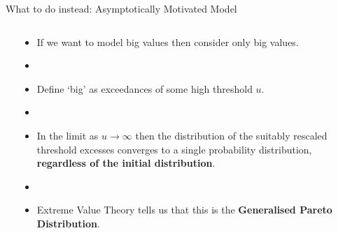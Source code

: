 \begin{frame}{What to do instead: Asymptotically Motivated Model}
\begin{columns}
\begin{column}{0.3\textwidth}
\end{column}
\begin{column}{0.7\textwidth}
\begin{itemize}
    \item If we want to model big values then consider only big values. \\
    \item []
    \item Define `big' as exceedances of some high threshold $u$. \\
    \item []
    \item In the limit as $u \rightarrow \infty$ then the distribution of the suitably rescaled threshold excesses converges to a single probability distribution, \textbf{regardless of the initial distribution}. \\
    \item []
    \item Extreme Value Theory tells us that this is the \textbf{Generalised Pareto Distribution}. 
\end{itemize}
\end{column}
\end{columns}
\end{frame}  

